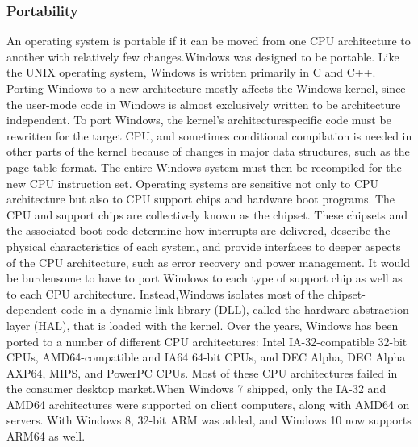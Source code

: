 \documentclass[12pt]{article}
\begin{document}
\subsubsection*{Portability}
An operating system is portable if it can be moved from one CPU architecture
to another with relatively few changes.Windows was designed to be portable.
Like the UNIX operating system, Windows is written primarily in C and C++. Porting Windows to a new architecture mostly affects the Windows
kernel, since the user-mode code in Windows is almost exclusively written
to be architecture independent. To port Windows, the kernel’s architecturespecific
code must be rewritten for the target CPU, and sometimes conditional
compilation is needed in other parts of the kernel because of changes in major
data structures, such as the page-table format. The entire Windows system
must then be recompiled for the new CPU instruction set. Operating systems are sensitive not only to CPU architecture but also to CPU
support chips and hardware boot programs. The CPU and support chips are
collectively known as the chipset. These chipsets and the associated boot code
determine how interrupts are delivered, describe the physical characteristics of
each system, and provide interfaces to deeper aspects of the CPU architecture,
such as error recovery and power management. It would be burdensome to
have to port Windows to each type of support chip as well as to each CPU
architecture. Instead,Windows isolates most of the chipset-dependent code in
a dynamic link library (DLL), called the hardware-abstraction layer (HAL), that
is loaded with the kernel. Over the years, Windows has been ported to a number of different CPU
architectures: Intel IA-32-compatible 32-bit CPUs, AMD64-compatible and IA64
64-bit CPUs, and DEC Alpha, DEC Alpha AXP64, MIPS, and PowerPC CPUs.
Most of these CPU architectures failed in the consumer desktop market.When
Windows 7 shipped, only the IA-32 and AMD64 architectures were supported
on client computers, along with AMD64 on servers. With Windows 8, 32-bit
ARM was added, and Windows 10 now supports ARM64 as well.
\end{document}
